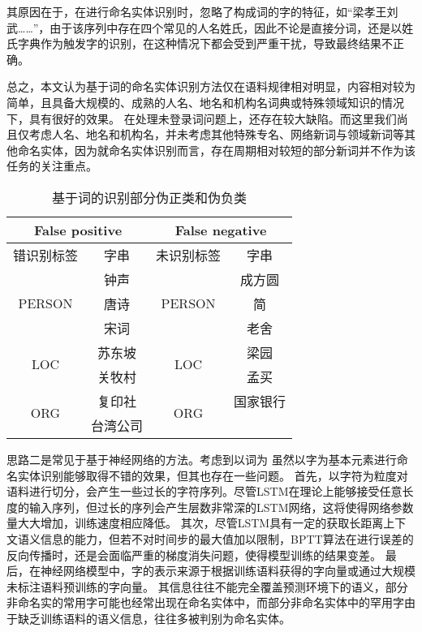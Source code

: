 其原因在于，在进行命名实体识别时，忽略了构成词的字的特征，如“梁孝王刘武……”，由于该序列中存在四个常见的人名姓氏，因此不论是直接分词，还是以姓氏字典作为触发字的识别，在这种情况下都会受到严重干扰，导致最终结果不正确。

总之，本文认为基于词的命名实体识别方法仅在语料规律相对明显，内容相对较为简单，且具备大规模的、成熟的人名、地名和机构名词典或特殊领域知识的情况下，具有很好的效果。
在处理未登录词问题上，还存在较大缺陷。而这里我们尚且仅考虑人名、地名和机构名，并未考虑其他特殊专名、网络新词与领域新词等其他命名实体，因为就命名实体识别而言，存在周期相对较短的部分新词并不作为该任务的关注重点。

\begin{table}[H]
    \centering
    \caption{基于词的识别部分伪正类和伪负类}
    \begin{tabular}{cccc}
        \toprule
        \multicolumn{2}{c}{False positive} & \multicolumn{2}{c}{False negative}\\
        \midrule
        错识别标签 & 字串 & 未识别标签 & 字串\\
        \cmidrule(lr){1-2}\cmidrule(lr){3-4}
        \multirow{3}{*}{PERSON} & 钟声 & \multirow{3}{*}{PERSON} & 成方圆 \\
        & 唐诗 & & 简 \\
        & 宋词 & & 老舍\\
        \cmidrule(lr){1-2}\cmidrule(lr){3-4}
        \multirow{2}{*}{LOC} & 苏东坡 & \multirow{2}{*}{LOC}& 梁园\\
        & 关牧村 & & 孟买 \\
        \cmidrule(lr){1-2}\cmidrule(lr){3-4}
        \multirow{2}{*}{ORG} & 复印社 & \multirow{2}{*}{ORG}& 国家银行\\
        & 台湾公司 & 联合国& \\
        \bottomrule
    \end{tabular}
    \label{tab:fp_fn_word}
\end{table}

思路二是常见于基于神经网络的方法。考虑到以词为
虽然以字为基本元素进行命名实体识别能够取得不错的效果，但其也存在一些问题。
首先，以字符为粒度对语料进行切分，会产生一些过长的字符序列。尽管LSTM在理论上能够接受任意长度的输入序列，但过长的序列会产生层数非常深的LSTM网络，这将使得网络参数量大大增加，训练速度相应降低。
其次，尽管LSTM具有一定的获取长距离上下文语义信息的能力，但若不对时间步的最大值加以限制，BPTT算法在进行误差的反向传播时，还是会面临严重的梯度消失问题，使得模型训练的结果变差。
最后，在神经网络模型中，字的表示来源于根据训练语料获得的字向量或通过大规模未标注语料预训练的字向量。
其信息往往不能完全覆盖预测环境下的语义，部分非命名实的常用字可能也经常出现在命名实体中，而部分非命名实体中的罕用字由于缺乏训练语料的语义信息，往往多被判别为命名实体。

